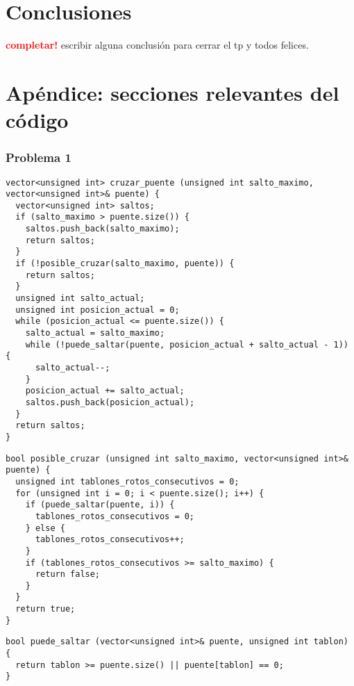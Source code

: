 \documentclass[a4paper]{article}
\begin{document}
\newpage

\section{Conclusiones}
    \textcolor{red}{\textbf{completar!}} \medskip
    escribir alguna conclusión para cerrar el tp y todos felices.

\newpage

\section{Apéndice: secciones relevantes del código}

\subsubsection{Problema 1}



\begin{lstlisting}
vector<unsigned int> cruzar_puente (unsigned int salto_maximo, vector<unsigned int>& puente) {
  vector<unsigned int> saltos;
  if (salto_maximo > puente.size()) {
    saltos.push_back(salto_maximo);
    return saltos;
  }
  if (!posible_cruzar(salto_maximo, puente)) {
    return saltos;
  }
  unsigned int salto_actual;
  unsigned int posicion_actual = 0;
  while (posicion_actual <= puente.size()) {
    salto_actual = salto_maximo;
    while (!puede_saltar(puente, posicion_actual + salto_actual - 1)) {
      salto_actual--;
    }
    posicion_actual += salto_actual;
    saltos.push_back(posicion_actual);
  }
  return saltos;
}
\end{lstlisting} 

\vspace*{0.5cm}

\begin{lstlisting}
bool posible_cruzar (unsigned int salto_maximo, vector<unsigned int>& puente) {
  unsigned int tablones_rotos_consecutivos = 0;
  for (unsigned int i = 0; i < puente.size(); i++) {
    if (puede_saltar(puente, i)) {
      tablones_rotos_consecutivos = 0;
    } else {
      tablones_rotos_consecutivos++;
    }
    if (tablones_rotos_consecutivos >= salto_maximo) {
      return false;
    }
  }
  return true;
}
\end{lstlisting}

\vspace*{0.5cm}

\begin{lstlisting}
bool puede_saltar (vector<unsigned int>& puente, unsigned int tablon) {
  return tablon >= puente.size() || puente[tablon] == 0;
}
\end{lstlisting}
\end{document}
